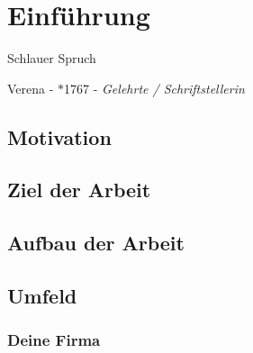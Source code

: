 \chapter{Einführung}
\label{cha:einfuehrung}
\epigraph{Schlauer Spruch}{Verena  - $\ast$1767 - \textit{Gelehrte / Schriftstellerin}}


\blindtext




\section{Motivation}
\blindtext



\section{Ziel der Arbeit}
\sblindtext



\section{Aufbau der Arbeit}
\blindtext



\section{Umfeld}

\subsection{Deine Firma}
\blindtext

